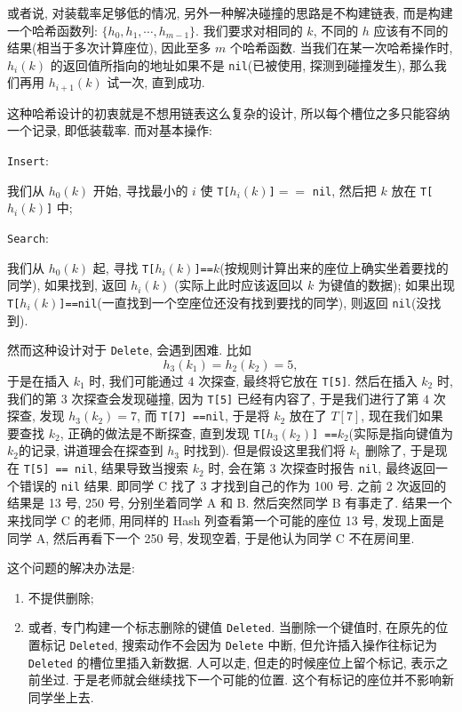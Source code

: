 \documentclass[a4paper]{ctexart}
\theoremstyle{definition}
\theoremstyle{definition}
\begin{document}
或者说, 对装载率足够低的情况, 另外一种解决碰撞的思路是不构建链表, 而是构建一个哈希函数列:
$\{h_0, h_1, \cdots, h_{m - 1}\}$. 我们要求对相同的 $k$, 不同的 $h$ 应该有不同的结果(相当于多次计算座位), 
因此至多 $m$ 个哈希函数. 当我们在某一次哈希操作时, $h_i(k)$ 的返回值所指向的地址如果不是 
\verb|nil|(已被使用, 探测到碰撞发生), 那么我们再用 $h_{i + 1}(k)$ 试一次, 直到成功.

这种哈希设计的初衷就是不想用链表这么复杂的设计, 所以每个槽位之多只能容纳一个记录, 
即低装载率. 而对基本操作:

\verb|Insert|:

我们从 $h_0(k)$ 开始, 寻找最小的 $i$ 使 \verb|T[|$h_i(k)$\verb|]|$==$
\verb|nil|, 然后把 $k$ 放在 \verb|T[|$h_i(k)$\verb|]| 中;

\verb|Search|:

我们从 $h_0(k)$ 起, 寻找 \verb|T[|$h_i(k)$\verb|]==|$k$(按规则计算出来的座位上确实坐着要找的同学), 
如果找到, 返回 $h_i(k)$ (实际上此时应该返回以 $k$ 为键值的数据); 如果出现
\verb|T[|$h_i(k)$\verb|]==nil|(一直找到一个空座位还没有找到要找的同学), 
则返回 \verb|nil|(没找到). 

然而这种设计对于 \verb|Delete|, 会遇到困难. 比如 
$$
h_3(k_1) = h_2(k_2) = 5, 
$$
于是在插入 $k_1$ 时, 我们可能通过 $4$ 次探查, 最终将它放在 \verb|T[5]|. 
然后在插入 $k_2$ 时, 我们的第 $3$ 次探查会发现碰撞, 因为 \verb|T[5]| 已经有内容了, 
于是我们进行了第 $4$ 次探查, 发现 $h_3(k_2) = 7$, 而 \verb|T[7] ==nil|, 
于是将 $k_2$ 放在了 $T[7]$, 现在我们如果要查找 $k_2$, 正确的做法是不断探查, 
直到发现 \verb|T[|$h_3(k_2)$\verb|] ==|$k_2$(实际是指向键值为 $k_2$的记录, 
讲道理会在探查到 $h_3$ 时找到). 但是假设这里我们将 $k_1$ 删除了, 
于是现在 \verb|T[5] == nil|, 结果导致当搜索 $k_2$ 时, 会在第 $3$ 次探查时报告 
\verb|nil|, 最终返回一个错误的 \verb|nil| 结果. 
即同学 C 找了 $3$ 才找到自己的作为 100 号. 之前 2 次返回的结果是 13 号, 250 号, 
分别坐着同学 A 和 B. 然后突然同学 B 有事走了. 结果一个来找同学 C 的老师, 用同样的 Hash 
列查看第一个可能的座位 13 号, 发现上面是同学 A, 然后再看下一个 250 号, 发现空着, 于是他认为同学 C 
不在房间里.

这个问题的解决办法是:

\begin{enumerate}
\item 不提供删除; 
\item 或者, 专门构建一个标志删除的键值 \verb|Deleted|. 当删除一个键值时, 
在原先的位置标记 \verb|Deleted|, 搜索动作不会因为 \verb|Delete| 中断, 
但允许插入操作往标记为 \verb|Deleted| 的槽位里插入新数据. 人可以走, 但走的时候座位上留个标记, 表示之前坐过. 
于是老师就会继续找下一个可能的位置. 这个有标记的座位并不影响新同学坐上去. 
\end{enumerate}
\end{document}
